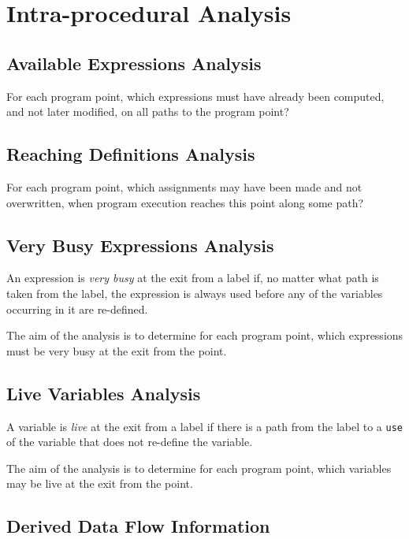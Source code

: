 \section{Intra-procedural Analysis}

\subsection{Available Expressions Analysis}

For each program point, which expressions must have already been
computed, and not later modified, on all paths to the program point?


\subsection{Reaching Definitions Analysis}

For each program point, which assignments may have been made and not
overwritten, when program execution reaches this point along some
path?

\subsection{Very Busy Expressions Analysis}

An expression is \textit{very busy} at the exit from a label if, no
matter what path is taken from the label, the expression is always
used before any of the variables occurring in it are re-defined.

The aim of the analysis is to determine for each program point, which
expressions must be very busy at the exit from the point.

\subsection{Live Variables Analysis}

A variable is \textit{live} at the exit from a label if there is a
path from the label to a \texttt{use} of the variable that does not
re-define the variable.

The aim of the analysis is to determine for each program point, which
variables may be live at the exit from the point.

\subsection{Derived Data Flow Information}

